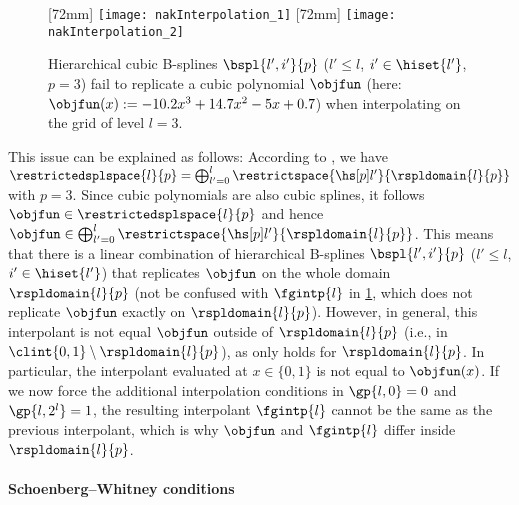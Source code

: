 \begin{figure}
  [72mm]{%
    \texttt{[image: nakInterpolation\_1]}%
  }%
  \hfill%
  [72mm]{%
    \texttt{[image: nakInterpolation\_2]}%
  }%
  \caption[%
    Issues when interpolating with uniform hierarchical B-splines%
  ]{%
    Hierarchical cubic B-splines $\bspl{l',i'}{p}$
    ($l' \le l$, $i' \in \hiset{l'}$, $p = 3$)
    fail to replicate a cubic polynomial $\objfun$
    (here: $\objfun(x) := -10.2 x^3 + 14.7 x^2 - 5x + 0.7$)
    when interpolating on the grid of level $l = 3$.%
  }%
  \label{fig:nakInterpolation}%
\end{figure}

This issue can be explained as follows:
According to ,
we have $\restrictedsplspace{l}{p}
= \bigoplus_{l'=0}^l \restrictspace{\hsbspl{l'}{p}}{\rspldomain{l}{p}}$
with $p = 3$.
Since cubic polynomials are also cubic splines,
it follows $\objfun \in \restrictedsplspace{l}{p}$ and hence
$\objfun \in \bigoplus_{l'=0}^l \restrictspace{\hsbspl{l'}{p}}{\rspldomain{l}{p}}$.
This means that there is a linear combination of hierarchical B-splines
$\bspl{l',i'}{p}$ ($l' \le l$, $i' \in \hiset{l'}$)
that replicates $\objfun$ on the whole domain $\rspldomain{l}{p}$
(not be confused with $\fgintp{l}$ in \cref{fig:nakInterpolation},
which does not replicate $\objfun$ exactly on $\rspldomain{l}{p}$).
However, in general, this interpolant is not equal $\objfun$ outside
of $\rspldomain{l}{p}$ (i.e., in $\clint{0, 1} \setminus \rspldomain{l}{p}$),
as  only holds for $\rspldomain{l}{p}$.
In particular, the interpolant evaluated at $x \in \{0, 1\}$ is not
equal to $\objfun(x)$.
If we now force the additional interpolation conditions in
$\gp{l,0} = 0$ and $\gp{l,2^l} = 1$,
the resulting interpolant $\fgintp{l}$ cannot be the same as the previous
interpolant,
which is why $\objfun$ and $\fgintp{l}$ differ inside $\rspldomain{l}{p}$.

\paragraph{Schoenberg--Whitney conditions}

